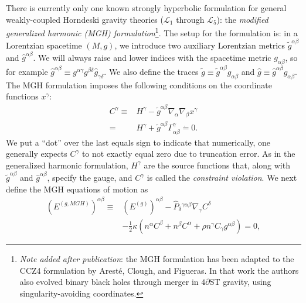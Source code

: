 \documentclass{ws-ijmpd}
\begin{document}
There is currently only one known strongly hyperbolic
formulation for general weakly-coupled Horndeski gravity
theories ($\mathcal{L}_1$ through $\mathcal{L}_5$): the 
\emph{modified generalized harmonic (MGH) 
formulation}\cite{Kovacs:2020pns,Kovacs:2020ywu}\footnote{\emph{Note added
after publication}: the MGH formulation has been adapted
to the CCZ4 formulation by
Arest\'{e}, Clough, and Figueras\cite{AresteSalo:2022hua}.
In that work the authors also evolved binary black holes through
merger in $4\partial$ST gravity, using singularity-avoiding coordinates.}.
The setup for the formulation is:
in a Lorentzian spacetime $(M,g)$, we introduce two auxiliary
Lorentzian metrics $\tilde{g}^{\alpha\beta}$ and 
$\hat{g}^{\alpha\beta}$.
We will always raise and lower indices with
the spacetime metric $g_{\alpha\beta}$,
so for example $\hat{g}^{\alpha\beta}\equiv
g^{\alpha\gamma}g^{\beta\delta}\hat{g}_{\gamma\delta}$.
We also define the traces 
$\tilde{g}\equiv \tilde{g}^{\alpha\beta}g_{\alpha\beta}$ and
$\hat{g}\equiv\hat{g}^{\alpha\beta}g_{\alpha\beta}$.
The MGH formulation imposes the following
conditions on the coordinate functions $x^{\gamma}$:
\begin{align}
\label{eq:mh_condition}
   C^{\gamma}
   \equiv&
   H^{\gamma}
   -	
   \tilde{g}^{\alpha\beta}
   \nabla_{\alpha}\nabla_{\beta}x^{\gamma}
   \nonumber\\
   =&
   H^{\gamma}
   +	
   \tilde{g}^{\alpha\beta}\Gamma_{\alpha\beta}^{\gamma}
   \dot{=}
   0
   .
\end{align} 
We put a ``dot'' over the last equals sign to indicate that numerically,
one generally expects $C^{\gamma}$ to not exactly equal zero
due to truncation error.
As in the generalized harmonic 
formulation\cite{Friedrich:1996hq,Garfinkle:2001ni,Pretorius:2004jg},
$H^{\gamma}$ are the source functions that, 
along with $\tilde{g}^{\alpha\beta}$ and $\hat{g}^{\alpha\beta}$,
specify the gauge, and $C^{\gamma}$ 
is called the \emph{constraint violation}.
We next define the MGH equations of motion as 
\begin{align}
\label{eq:basic_mgh_eom}
   \left(E^{(g,MGH)}\right)^{\alpha\beta}
   \equiv
   &
   \left(E^{(g)}\right)^{\alpha\beta}
   -	
   \hat{P}_{\delta}{}^{\gamma\alpha\beta}
   \nabla_{\gamma}C^{\delta}
\nonumber\\
   &
   - 
   \frac{1}{2}\kappa\left(
      n^{\alpha}C^{\beta}
      +	
      n^{\beta}C^{\alpha}
      +	
      \rho n^{\gamma}C_{\gamma} g^{\alpha\beta}
   \right)
   =
   0
   ,
\end{align}
\end{document}

